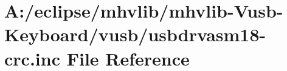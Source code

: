 \hypertarget{mhvlib-_vusb-_keyboard_2vusb_2usbdrvasm18-crc_8inc}{\section{A\-:/eclipse/mhvlib/mhvlib-\/\-Vusb-\/\-Keyboard/vusb/usbdrvasm18-\/crc.inc File Reference}
\label{mhvlib-_vusb-_keyboard_2vusb_2usbdrvasm18-crc_8inc}
}

